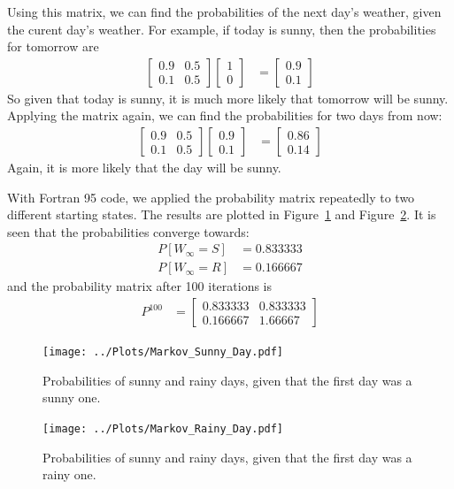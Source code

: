 \documentclass[twocolumn]{myarticle}
\newcommand{\mat}[1]{\begin{bmatrix}#1\end{bmatrix}}
\begin{document}
Using this matrix, we can find the probabilities of the next day's weather, given the curent day's weather.
For example, if today is sunny, then the probabilities for tomorrow are
\begin{align}
    \mat{0.9 & 0.5 \\ 0.1 & 0.5} \mat{1 \\ 0} &= \mat{0.9 \\ 0.1}
\end{align}
So given that today is sunny, it is much more likely that tomorrow will be sunny.
Applying the matrix again, we can find the probabilities for two days from now:
\begin{align}
    \mat{0.9 & 0.5 \\ 0.1 & 0.5} \mat{0.9 \\ 0.1} &= \mat{0.86 \\ 0.14}
\end{align}
Again, it is more likely that the day will be sunny.

With Fortran 95 code, we applied the probability matrix repeatedly to two different starting states.
The results are plotted in Figure~\ref{fig:markov_sunny_day} and Figure~\ref{fig:markov_rainy_day}.
It is seen that the probabilities converge towards:
\begin{align}
    P[W_\infty = S] &= 0.833333
    \\
    P[W_\infty = R] &= 0.166667
\end{align}
and the probability matrix after 100 iterations is
\begin{align}
    P^{100} &= \mat{0.833333 & 0.833333 \\ 0.166667 & 1.66667}
\end{align}

\begin{figure}[ht!]
    \begin{center}
    \texttt{[image: ../Plots/Markov\_Sunny\_Day.pdf]}
    \caption{%
    Probabilities of sunny and rainy days, given that the first day was a sunny one.
    }
    \label{fig:markov_sunny_day}
    \end{center}
\end{figure}

\begin{figure}[ht!]
    \begin{center}
    \texttt{[image: ../Plots/Markov\_Rainy\_Day.pdf]}
    \caption{%
    Probabilities of sunny and rainy days, given that the first day was a rainy one.
    }
    \label{fig:markov_rainy_day}
    \end{center}
\end{figure}
\end{document}
